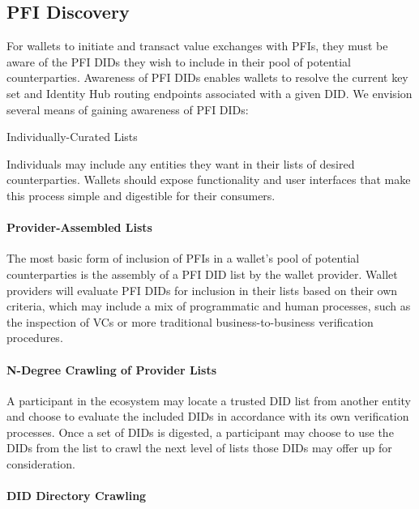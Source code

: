 \documentclass[11pt]{article}
\begin{document}
\vspace{1\baselineskip}
\subsection{PFI Discovery}

\vspace{1\baselineskip}
For wallets to initiate and transact value exchanges with PFIs, they must be aware of the PFI DIDs they wish to include in their pool of potential counterparties. Awareness of PFI DIDs enables wallets to resolve the current key set and Identity Hub routing endpoints associated with a given DID. We envision several means of gaining awareness of PFI DIDs:

\vspace{1\baselineskip}
{\Large \textcolor[HTML]{434343}{Individually-Curated Lists}}

Individuals may include any entities they want in their lists of desired counterparties. Wallets should expose functionality and user interfaces that make this process simple and digestible for their consumers.

\paragraph{Provider-Assembled Lists}

The most basic form of inclusion of PFIs in a wallet’s pool of potential counterparties is the assembly of a PFI DID list by the wallet provider. Wallet providers will evaluate PFI DIDs for inclusion in their lists based on their own criteria, which may include a mix of programmatic and human processes, such as the inspection of VCs or more traditional business-to-business verification procedures.

\paragraph{N-Degree Crawling of Provider Lists}

A participant in the ecosystem may locate a trusted DID list from another entity and choose to evaluate the included DIDs in accordance with its own verification processes. Once a set of DIDs is digested, a participant may choose to use the DIDs from the list to crawl the next level of lists those DIDs may offer up for consideration.

\paragraph{DID Directory Crawling}
\end{document}
